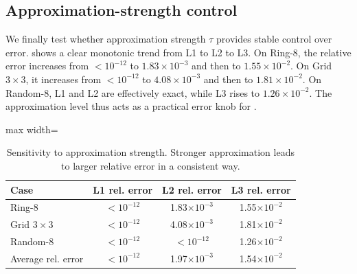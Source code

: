 \subsection{Approximation-strength control}

We finally test whether approximation strength $\tau$ provides stable control over error.  shows a clear monotonic trend from \textsf{L1} to \textsf{L2} to \textsf{L3}. On Ring-8, the relative error increases from $<10^{-12}$ to $1.83\times 10^{-3}$ and then to $1.55\times 10^{-2}$. On Grid $3\times 3$, it increases from $<10^{-12}$ to $4.08\times 10^{-3}$ and then to $1.81\times 10^{-2}$. On Random-8, \textsf{L1} and \textsf{L2} are effectively exact, while \textsf{L3} rises to $1.26\times 10^{-2}$. The approximation level thus acts as a practical error knob for \method{}.

\begin{table}[t]
\centering
\small
\caption{Sensitivity to approximation strength. Stronger approximation leads to larger relative error in a consistent way.}
\label{tab:strength-sensitivity-core}
\begin{adjustbox}{max width=\columnwidth}
\begin{tabular}{lccc}
\toprule
Case & L1 rel. error & L2 rel. error & L3 rel. error \\
\midrule
Ring-8 & $<10^{-12}$ & 1.83$\times 10^{-3}$ & 1.55$\times 10^{-2}$ \\
Grid $3\times 3$ & $<10^{-12}$ & 4.08$\times 10^{-3}$ & 1.81$\times 10^{-2}$ \\
Random-8 & $<10^{-12}$ & $<10^{-12}$ & 1.26$\times 10^{-2}$ \\
\midrule
Average rel. error & $<10^{-12}$ & 1.97$\times 10^{-3}$ & 1.54$\times 10^{-2}$ \\
\bottomrule
\end{tabular}
\end{adjustbox}
\end{table}
